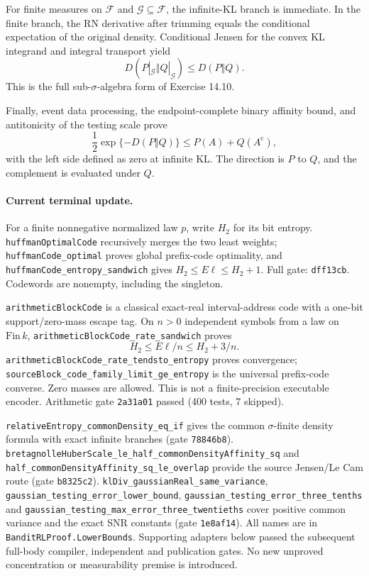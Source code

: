 For finite measures on $\mathcal F$ and $\mathcal G\subseteq\mathcal F$,
the infinite-KL branch is immediate. In the finite branch, the RN derivative
after trimming equals the conditional expectation of the original density.
Conditional Jensen for the convex KL integrand and integral transport yield
\[
 D(P|_{\mathcal G}\Vert Q|_{\mathcal G})\le D(P\Vert Q).
\]
This is the full sub-$\sigma$-algebra form of Exercise 14.10.

Finally, event data processing, the endpoint-complete binary affinity bound,
and antitonicity of the testing scale prove
\[
 \frac12\exp\{-D(P\Vert Q)\}\le P(A)+Q(A^{\mathrm c}),
\]
with the left side defined as zero at infinite KL. The direction is $P$ to
$Q$, and the complement is evaluated under $Q$.

\paragraph{Current terminal update.}
For a finite nonnegative normalized law $p$, write $H_2$ for its bit entropy.
\texttt{huffmanOptimalCode} recursively merges the two least weights;
\texttt{huffmanCode\_optimal} proves global prefix-code optimality, and
\texttt{huffmanCode\_entropy\_sandwich} gives $H_2\le E\ell\le H_2+1$.
Full gate: \texttt{dff13cb}. Codewords are nonempty, including the singleton.

\texttt{arithmeticBlockCode} is a classical exact-real interval-address code
with a one-bit support/zero-mass escape tag. On $n>0$ independent symbols
from a law on $\mathrm{Fin}\,k$,
\texttt{arithmeticBlockCode\_rate\_sandwich} proves
\[
 H_2\le E\ell/n\le H_2+3/n.
\]
\texttt{arithmeticBlockCode\_rate\_tendsto\_entropy} proves convergence;
\texttt{sourceBlock\_code\_family\_\allowbreak limit\_ge\_entropy} is the universal
prefix-code converse. Zero masses are allowed. This is not a finite-precision
executable encoder. Arithmetic gate \texttt{2a31a01} passed (400 tests, 7 skipped).

\texttt{relativeEntropy\_commonDensity\_eq\_if} gives the common
$\sigma$-finite density formula with exact infinite branches (gate
\texttt{78846b8}).
\texttt{bretagnolleHuberScale\_le\_half\_commonDensityAffinity\_sq} and
\texttt{half\_commonDensityAffinity\_sq\_le\_overlap} provide the source
Jensen/Le Cam route (gate \texttt{b8325c2}).
\texttt{klDiv\_gaussianReal\_same\_variance},
\texttt{gaussian\_testing\_error\_lower\_bound},
\texttt{gaussian\_testing\_error\_three\_tenths} and
\texttt{gaussian\_testing\_max\_error\_three\_twentieths} cover positive
common variance and the exact SNR constants (gate \texttt{1e8af14}).
All names are in \texttt{BanditRLProof.LowerBounds}. Supporting adapters below
passed the subsequent full-body compiler, independent and publication gates.
No new unproved concentration or measurability premise is introduced.

